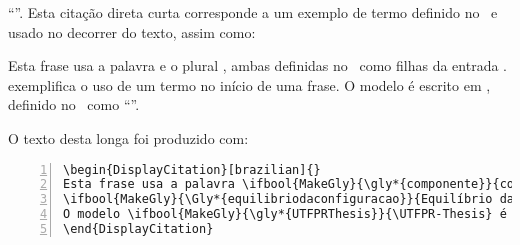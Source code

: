 \enquote{}.
Esta citação direta curta corresponde a um exemplo de termo definido no \glyref\ e usado no decorrer do texto, assim como:

\begin{DisplayCitation}[brazilian]{}
Esta frase usa a palavra  e o plural , ambas definidas no \glyref\ como filhas da entrada .
 exemplifica o uso de um termo no início de uma frase.
O modelo  é escrito em , definido no \glyref\ como \enquote{}.
\end{DisplayCitation}

O texto desta   longa foi produzido com:

\begin{snugshade}
\begin{Verbatim}[numbers = left]
\begin{DisplayCitation}[brazilian]{}
Esta frase usa a palavra \ifbool{MakeGly}{\gly*{componente}}{componente} e o plural \ifbool{MakeGly}{\glypl*{filho}}{filhos}, ambas definidas no \glyref\ como filhas da entrada \ifbool{MakeGly}{\gly*{pai}}{pai}.
\ifbool{MakeGly}{\Gly*{equilibriodaconfiguracao}}{Equilíbrio da configuração} exemplifica o uso de um termo no início de uma frase.
O modelo \ifbool{MakeGly}{\gly*{UTFPRThesis}}{\UTFPR-Thesis} é escrito em \ifbool{MakeGly}{\gly*{LaTeX}}{\LaTeX}, definido no \glyref\ como \enquote{\ifbool{MakeGly}{\glydescr{LaTeX}}{conjunto de macros para o processador de textos \TeX, utilizado amplamente para a produção de textos matemáticos e científicos devido à sua alta qualidade tipográfica}}.
\end{DisplayCitation}
\end{Verbatim}
\end{snugshade}

